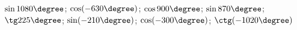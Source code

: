 \begin{ex}[type=calculate]
	\begin{condition}
		\( \sin1080\degree \); \( \cos(-630\degree) \); \( \cos900\degree \); \( \sin870\degree \); \( \tg225\degree \); \( \sin(-210\degree) \); \( \cos(-300\degree) \); \( \ctg(-1020\degree) \)
	\end{condition}
\end{ex}